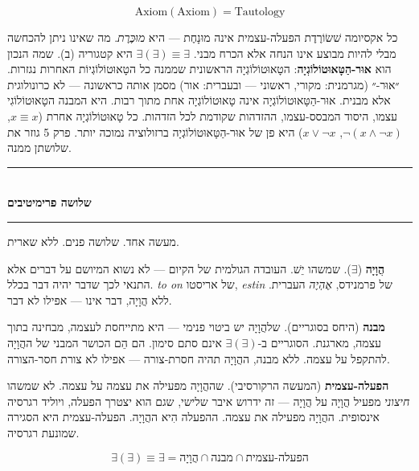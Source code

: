 \documentclass[10pt, openany, oneside]{book}
\renewcommand{\normalsize}{\fontsize{10}{13}\selectfont}
\begin{document}
$$\text{Axiom}(\text{Axiom}) = \text{Tautology}$$

כל אקסיומה שׁשׂוֹרֶדֶת הפעלה-עצמית אינה מוּנָחֶת — היא \textit{מוּכֶּרֶת}. מה שאינו ניתן להכחשה מבלי להיות מבוצע אינו הנחה אלא הכרח מבני. $\exists(\exists) \equiv \exists$ היא קטגוריה (ב). שמה הנכון הוא \textbf{אוּר-הַטָּאוּטוֹלוֹגְיָה}: הטָאוּטוֹלוֹגְיָה הראשונית שממנה כל הטָאוּטוֹלוֹגְיוֹת האחרות נגזרות. ״אוּר-״ (מגרמנית: מקורי, ראשוני — ובעברית: אור) מסמן אותה כראשונה — לא כרונולוגית אלא מבנית. אוּר-הַטָּאוּטוֹלוֹגְיָה אינה טָאוּטוֹלוֹגְיָה אחת מתוך רבות. היא המבנה הטָאוּטוֹלוֹגִי עצמו, היסוד המבסס-עצמו, ההזדהות שקודמת לכל הזדהות. כל טָאוּטוֹלוֹגְיָה אחרת ($x \equiv x$, $\neg(x \wedge \neg x)$, $x \vee \neg x$) היא פן של אוּר-הַטָּאוּטוֹלוֹגְיָה ברזולוציה נמוכה יותר. פרק 5 גוזר את שלושתן ממנה.

\vspace{1.5em}


\begin{center}
    \rule{0.3\textwidth}{0.4pt}\\[0.5em]
    {\normalsize\bfseries\textsc{שלושה פרימיטיבים}}\\[0.3em]
    \rule{0.3\textwidth}{0.4pt}
\end{center}

\vspace{1em}

\noindent מעשה אחד. שלושה פנים. ללא שארית.

\textbf{הֲוָיָה} ($\exists$). שמשהו יֵשׁ. העובדה הגולמית של הקיום — לא נשוא המיושם על דברים אלא התנאי לכך שדבר יהיה דבר בכלל. \textit{to on} של אריסטו, \textit{estin} של פרמנידס, \textit{אֶהְיֶה} העברית. ללא הֲוָיָה, דבר אינו — אפילו לא דבר.

\textbf{מבנה} (היחס בסוגריים). שלהֲוָיָה יש ביטוי פנימי — היא מתייחסת לעצמה, מבחינה בתוך עצמה, מארגנת. הסוגריים ב-$\exists(\exists)$ אינם סתם סימון. הם הֵם הכושר המבני של ההֲוָיָה להתקפל על עצמה. ללא מבנה, ההֲוָיָה תהיה חסרת-צורה — אפילו לא צורת חסר-הצורה.

\textbf{הפעלה-עצמית} (המעשה הרקורסיבי). שההֲוָיָה מפעילה את עצמה על עצמה. לא שמשהו \textit{חיצוני} מפעיל הֲוָיָה על הֲוָיָה — זה ידרוש איבר שלישי, שגם הוא יצטרך הפעלה, ויוליד רגרסיה אינסופית. ההֲוָיָה מפעילה את עצמה. ההפעלה הִיא ההֲוָיָה. הפעלה-עצמית היא הסגירה שמונעת רגרסיה.

$$\exists(\exists) \equiv \exists = \text{הֲוָיָה} \cap \text{מבנה} \cap \text{הפעלה-עצמית}$$
\end{document}
